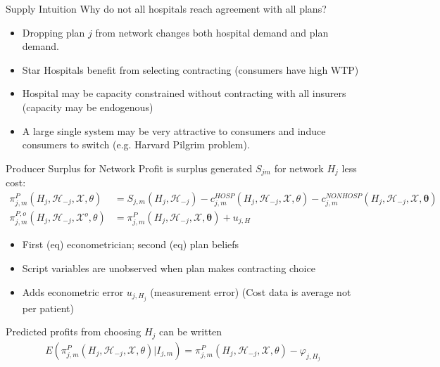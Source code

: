 \documentclass[xcolor=pdftex,dvipsnames,table,mathserif,aspectratio=169]{beamer}
\begin{document}
\begin{frame}{Supply Intuition}
Why do not all hospitals reach agreement with all plans?
\begin{itemize}
\item Dropping plan $j$ from network changes both hospital demand and plan demand.
 \item Star Hospitals benefit from selecting contracting (consumers have high WTP)
 \item Hospital may be capacity constrained without contracting with all insurers (capacity may be endogenous)
 \item A large single system may be very attractive to consumers and induce consumers to switch (e.g. Harvard Pilgrim problem).
 \end{itemize}
\end{frame}


\begin{frame}{Producer Surplus for Network}
Profit is surplus generated $S_{jm}$ for network $H_j$ less cost:
\begin{align*}
\pi_{j, m}^{P}\left(H_{j}, \mathcal{H}_{-j}, \mathcal{X}, \theta\right)&=S_{j, m}\left(H_{j}, \mathcal{H}_{-j}\right)-c_{j, m}^{H O S P}\left(H_{j}, \mathcal{H}_{-j}, \mathcal{X}, \theta\right)-c_{j, m}^{N O N H O S P}\left(H_{j}, \mathcal{H}_{-j}, \mathcal{X}, \boldsymbol{\theta}\right) \\
\pi_{j, m}^{P, o}\left(H_{j}, \mathcal{H}_{-j}, \mathcal{X}^{o}, \theta\right)&=\pi_{j, m}^{P}\left(H_{j}, \mathcal{H}_{-j}, \mathcal{X}, \boldsymbol{\theta}\right)+u_{j, H}
\end{align*}
\begin{itemize}
\item First (eq) econometrician; second (eq) plan beliefs
\item Script variables are unobserved when plan makes contracting choice
\item Adds econometric error $u_{j,H_j}$ (measurement error) (Cost data is average not per patient)
\end{itemize}
Predicted profits from choosing $H_j$ can be written
\begin{align*}
E\left(\pi_{j, m}^{P}\left(H_{j}, \mathcal{H}_{-j}, \mathcal{X}, \theta\right) | I_{j, m}\right)=\pi_{j, m}^{P}\left(H_{j}, \mathcal{H}_{-j}, \mathcal{X}, \theta\right)-\varphi_{j, H_{j}}
\end{align*}
\end{frame}
\end{document}

